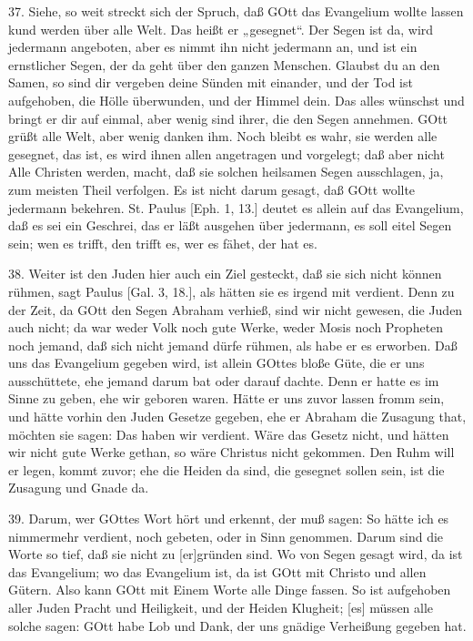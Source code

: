 37. Siehe, so weit streckt sich der Spruch, daß GOtt das Evangelium wollte lassen kund werden über alle Welt. Das heißt er „gesegnet“. Der Segen ist da, wird jedermann angeboten, aber es nimmt ihn nicht jedermann an, und ist ein ernstlicher Segen, der da geht über den ganzen Menschen. Glaubst du an den Samen, so sind dir vergeben deine Sünden mit einander, und der Tod ist aufgehoben, die Hölle überwunden, und der Himmel dein. Das alles wünschst und bringt er dir auf einmal, aber wenig sind ihrer, die den Segen annehmen. GOtt grüßt alle Welt, aber wenig danken ihm. Noch bleibt es wahr, sie werden alle gesegnet, das ist, es wird ihnen allen angetragen und vorgelegt; daß aber nicht Alle Christen werden, macht, daß sie solchen heilsamen Segen ausschlagen, ja, zum meisten Theil verfolgen. Es ist nicht darum gesagt, daß GOtt wollte jedermann bekehren. St. Paulus [Eph. 1, 13.] deutet es allein auf das Evangelium, daß es sei ein Geschrei, das er läßt ausgehen über jedermann, es soll eitel Segen sein; wen es trifft, den trifft es, wer es fähet, der hat es.

38. Weiter ist den Juden hier auch ein Ziel gesteckt, daß sie sich nicht können rühmen, sagt Paulus [Gal. 3, 18.], als hätten sie es irgend mit verdient. Denn zu der Zeit, da GOtt den Segen Abraham verhieß, sind wir nicht gewesen, die Juden auch nicht; da war weder Volk noch gute Werke, weder Mosis noch Propheten noch jemand, daß sich nicht jemand dürfe rühmen, als habe er es erworben. Daß uns das Evangelium gegeben wird, ist allein GOttes bloße Güte, die er uns ausschüttete, ehe jemand darum bat oder darauf dachte. Denn er hatte es im Sinne zu geben, ehe wir geboren waren. Hätte er uns zuvor lassen fromm sein, und hätte vorhin den Juden Gesetze gegeben, ehe er Abraham die Zusagung that, möchten sie sagen: Das haben wir verdient. Wäre das Gesetz nicht, und hätten wir nicht gute Werke gethan, so wäre Christus nicht gekommen. Den Ruhm will er legen, kommt zuvor; ehe die Heiden da sind, die gesegnet sollen sein, ist die Zusagung und Gnade da.

39. Darum, wer GOttes Wort hört und erkennt, der muß sagen: So hätte ich es nimmermehr verdient, noch gebeten, oder in Sinn genommen. Darum sind die Worte so tief, daß sie nicht zu [er]gründen sind. Wo von Segen gesagt wird, da ist das Evangelium; wo das Evangelium ist, da ist GOtt mit Christo und allen Gütern. Also kann GOtt mit Einem Worte alle Dinge fassen. So ist aufgehoben aller Juden Pracht und Heiligkeit, und der Heiden Klugheit; [es] müssen alle solche sagen: GOtt habe Lob und Dank, der uns gnädige Verheißung gegeben hat.

